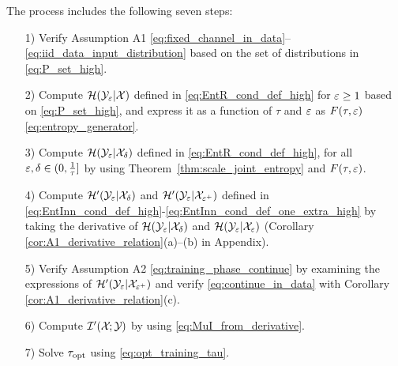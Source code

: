 \documentclass[12pt, draftclsnofoot,journal,onecolumn]{IEEEtran}
\begin{document}
The process includes the following seven steps:
\begin{itemize}
    \item [1)] Verify Assumption A1 \eqref{eq:fixed_channel_in_data}--\eqref{eq:iid_data_input_distribution} based on the set of distributions in \eqref{eq:P_set_high}.
    
    \item [2)] Compute $\mathcal{H}(\mathcal{Y}_\varepsilon|\mathcal{X})$ defined in \eqref{eq:EntR_cond_def_high} for $\varepsilon \ge 1$ based on \eqref{eq:P_set_high}, and express it as a function of $\tau$ and $\varepsilon$ as $F(\tau,\varepsilon)$ \eqref{eq:entropy_generator}.
    
    \item [3)] Compute $\mathcal{H}(\mathcal{Y}_\varepsilon|\mathcal{X}_\delta)$ defined in \eqref{eq:EntR_cond_def_high}, for all $\varepsilon, \delta \in (0, \frac{1}{\tau}]$ by using Theorem~\ref{thm:scale_joint_entropy} and $F(\tau,\varepsilon)$.
    
    \item [4)] Compute ${\mathcal{H}{'}}({\mathcal{Y}}_{\varepsilon}|{\mathcal{X}}_{\delta})$ and ${\mathcal{H}{'}}({\mathcal{Y}}_{\varepsilon}|{\mathcal{X}}_{\varepsilon^+})$ defined in \eqref{eq:EntInn_cond_def_high}-\eqref{eq:EntInn_cond_def_one_extra_high} by taking the derivative of $\mathcal{H}(\mathcal{Y}_\varepsilon|\mathcal{X}_\delta)$ and $\mathcal{H}(\mathcal{Y}_\varepsilon|\mathcal{X}_\varepsilon)$ (Corollary \ref{cor:A1_derivative_relation}(a)--(b) in Appendix).
    
    \item [5)] Verify Assumption A2 \eqref{eq:training_phase_continue} by examining the expressions of ${\mathcal{H}{'}}({\mathcal{Y}}_{\varepsilon}|{\mathcal{X}}_{\varepsilon^+})$ and verify \eqref{eq:continue_in_data} with Corollary \ref{cor:A1_derivative_relation}(c).
    
    \item [6)] Compute $\mathcal{I}{'}({\mathcal{X}}_{};{\mathcal{Y}}_{})$ by using \eqref{eq:MuI_from_derivative}.

    \item [7)] Solve $\tau_{{\rm opt}}$ using \eqref{eq:opt_training_tau}.
    
\end{itemize}
    
    
\end{document}
